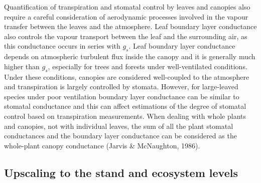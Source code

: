 \documentclass[11pt,twoside]{reedthesis}
\begin{document}
Quantification of transpiration and stomatal control by leaves and
canopies also require a careful consideration of aerodynamic processes
involved in the vapour transfer between the leaves and the atmosphere.
Leaf boundary layer conductance also controls the vapour transport
between the leaf and the surrounding air, as this conductance occurs in
series with \(g_s\). Leaf boundary layer conductance depends on
atmospheric turbulent flux inside the canopy and it is generally much
higher than \(g_s\), especially for trees and forests under
well-ventilated conditions. Under these conditions, canopies are
considered well-coupled to the atmosphere and transpiration is largely
controlled by stomata. However, for large-leaved species under poor
ventilation boundary layer conductance can be similar to stomatal
conductance and this can affect estimations of the degree of stomatal
control based on transpiration measurements. When dealing with whole
plants and canopies, not with individual leaves, the sum of all the
plant stomatal conductances and the boundary layer conductance can be
considered as the whole-plant canopy conductance (Jarvis \& McNaughton,
1986).\par

\subsection{Upscaling to the stand and ecosystem
levels}\label{upscaling-to-the-stand-and-ecosystem-levels}
\end{document}

